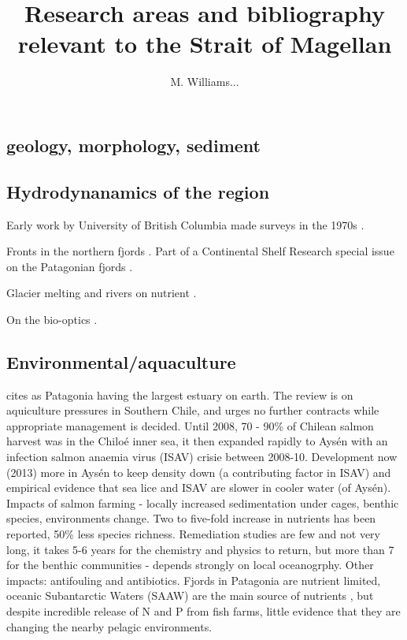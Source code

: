 \documentclass[11pt, oneside]{article}   	%
\title{Research areas and bibliography relevant to the Strait of Magellan}
\author{M. Williams...}
\begin{document}
\maketitle
\subsection{geology, morphology, sediment}

\citep{simeoni97}

\subsection{Hydrodynanamics of the region} 

Early work by University of British Columbia made surveys in the 1970s \citep{pickard71}.

Fronts in the northern fjords \citep{calvete11}. Part of a Continental Shelf Research special issue on the Patagonian fjords \cite{pantoja11}.

Glacier melting and rivers on nutrient \citep{vargas18}.

On the bio-optics \citep{lutz16}.

\subsection{Environmental/aquaculture}

\citep{niklitschek13} cites \citet{iriarte10} as Patagonia having the largest estuary on earth. The \citet{niklitschek13} review is on aquiculture pressures in Southern Chile, and urges no further contracts while appropriate management is decided. Until 2008, 70 - 90\% of Chilean salmon harvest was in the Chilo{\'e} inner sea, it then expanded rapidly to  Ays{\'e}n with an infection salmon anaemia virus (ISAV) crisie between 2008-10. Development now (2013) more in Ays{\'e}n to keep density down (a contributing factor in ISAV) and empirical evidence that sea lice and ISAV are slower in cooler water (of Ays{\'e}n). Impacts of salmon farming - locally increased sedimentation under cages, benthic species, environments change. Two to five-fold increase in nutrients has been reported, 50\% less species richness. Remediation studies are few and not very long, it takes 5-6 years for the chemistry and physics to return, but more than 7 for the benthic communities - depends strongly on local oceanogrphy. Other impacts: antifouling and antibiotics. Fjords in Patagonia are nutrient limited, oceanic Subantarctic Waters (SAAW) are the main source of nutrients \citep{iriarte10}, but despite incredible release of N and P from fish farms, little evidence that they are changing the nearby pelagic environments. 
\end{document}
